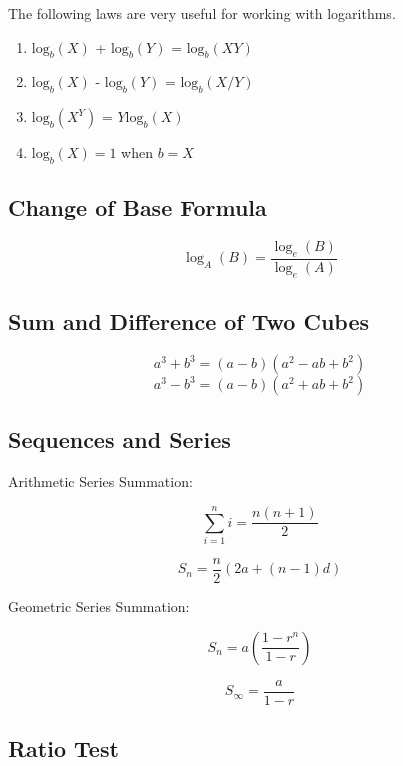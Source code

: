 	The following laws are very useful for working with logarithms.
	\begin{multicols}{2}
	\begin{enumerate}
		\item $\mbox{log}_b(X)$ + $\mbox{log}_b(Y)$ = $\mbox{log}_b(XY)$\bigskip
		\item $\mbox{log}_b(X)$ - $\mbox{log}_b(Y)$ = $\mbox{log}_b(X / Y)$ \bigskip
		\item $\mbox{log}_b(X^Y)$ = $Y \mbox{log}_b(X)$
		
		\item $\mbox{log}_b(X) = 1 $ when $b=X$
	\end{enumerate}
	\end{multicols}


\subsection*{Change of Base Formula}

\[ \log_A(B) = \frac{ \log_e(B) }{ \log_e(A) }  \]
	\subsection*{Sum and Difference of Two Cubes}
	\[ a^3 + b^3 = (a-b)(a^2 - ab + b^2)\]
	\[ a^3 - b^3 = (a-b)(a^2 + ab + b^2)\]
	
	
	\subsection*{Sequences and Series}
	




Arithmetic Series Summation:
\begin{multicols}{2}	
	\[ \sum_{i=1}^{n} i = \frac{n(n+1)}{2}\]
	

	\[ S_n = \frac{n}{2} \left(2a + (n-1) d \right)\]
\end{multicols}	
	Geometric Series Summation:
	\begin{multicols}{2}
	\[ S_n = a\left(\frac{1-r^n}{1-r}\right)\]
	
	\[ S_\infty = \frac{a}{1-r}\]
	\end{multicols}
	
	
	\subsection*{Ratio Test}
	
